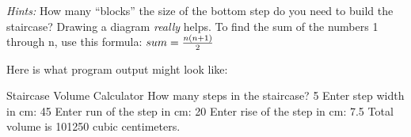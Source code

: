 \begin{exercise}
{\em Hints:} How many ``blocks'' the size of the bottom step do you need to build the staircase? Drawing a diagram {\em really} helps. To find the sum of the numbers 1 through n, use this formula: $sum = {{n(n+1)}\over 2}$

Here is what program output might look like:

\begin{stdout}
Staircase Volume Calculator
How many steps in the staircase? 5
Enter step width in cm: 45
Enter run of the step in cm: 20
Enter rise of the step in cm: 7.5
Total volume is 101250 cubic centimeters.
\end{stdout}
\end{exercise}


